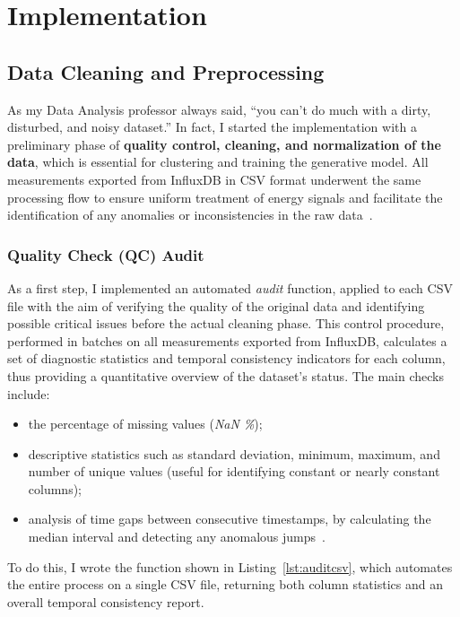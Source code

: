 \chapter{Implementation}

\section{Data Cleaning and Preprocessing}

As my Data Analysis professor always said, “you can't do much with a dirty, disturbed, and noisy dataset.”  
In fact, I started the implementation with a preliminary phase of \textbf{quality control, cleaning, and normalization of the data}, which is essential for clustering and training the generative model.  
All measurements exported from InfluxDB in CSV format underwent the same processing flow to ensure uniform treatment of energy signals and facilitate the identification of any anomalies or inconsistencies in the raw data~\cite{han2011data, aggarwal2015data}.

\subsection{Quality Check (QC) Audit}

As a first step, I implemented an automated \emph{audit} function, applied to each CSV file with the aim of verifying the quality of the original data and identifying possible critical issues before the actual cleaning phase.  
This control procedure, performed in batches on all measurements exported from InfluxDB, calculates a set of diagnostic statistics and temporal consistency indicators for each column, thus providing a quantitative overview of the dataset’s status.  
The main checks include:
\begin{itemize}
  \item the percentage of missing values (\emph{NaN \%});
  \item descriptive statistics such as standard deviation, minimum, maximum, and number of unique values (useful for identifying constant or nearly constant columns);
  \item analysis of time gaps between consecutive timestamps, by calculating the median interval and detecting any anomalous jumps~\cite{little2019statistical}.
\end{itemize}

To do this, I wrote the function shown in Listing~\ref{lst:auditcsv}, which automates the entire process on a single CSV file, returning both column statistics and an overall temporal consistency report.


